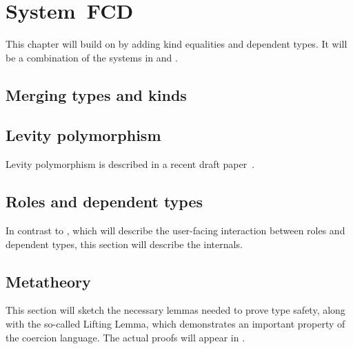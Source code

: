 \chapter{System~FCD}
\label{cha:fcd}

\begin{proposal}
This chapter will build on  by adding kind equalities
and dependent types. It will be a combination of the systems in \citet{nokinds}
and \citet{gundry-thesis}.
\end{proposal}

\section{Merging types and kinds}

\section{Levity polymorphism}

\begin{proposal}
Levity polymorphism is described in a recent draft paper~\cite{equalities}.
\end{proposal}

\section{Roles and dependent types}

\begin{proposal}
In contrast to , which will describe
the user-facing interaction between roles and dependent types, this section
will describe the internals.
\end{proposal}

\section{Metatheory}

\begin{proposal}
This section will sketch the necessary lemmas needed to prove type safety,
along with the so-called Lifting Lemma, which demonstrates an important
property of the coercion language. The actual proofs will appear in
.
\end{proposal}
